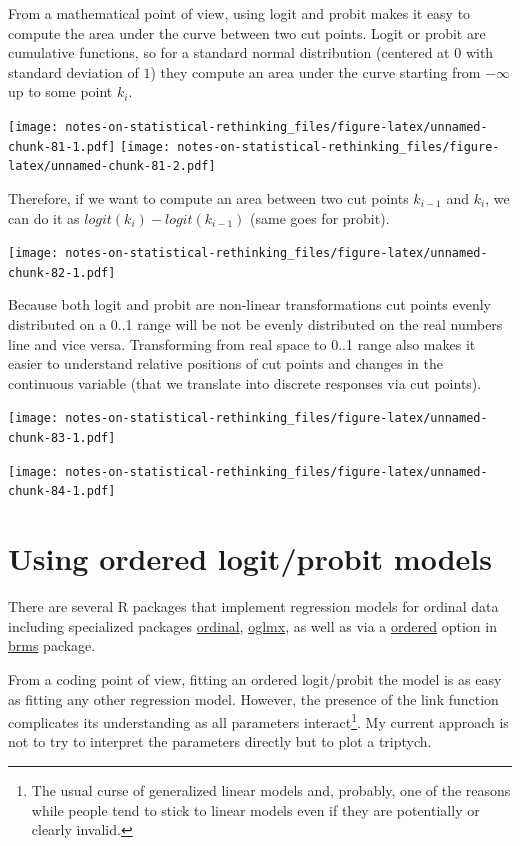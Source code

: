 \documentclass[
]{book}
\begin{document}
From a mathematical point of view, using logit and probit makes it easy to compute the area under the curve between two cut points. Logit or probit are cumulative functions, so for a standard normal distribution (centered at \(0\) with standard deviation of \(1\)) they compute an area under the curve starting from \(-\infty\) up to some point \(k_i\).

\texttt{[image: notes-on-statistical-rethinking\_files/figure-latex/unnamed-chunk-81-1.pdf]} \texttt{[image: notes-on-statistical-rethinking\_files/figure-latex/unnamed-chunk-81-2.pdf]}

Therefore, if we want to compute an area between two cut points \(k_{i-1}\) and \(k_i\), we can do it as \(logit(k_{i})-logit(k_{i-1})\) (same goes for probit).

\texttt{[image: notes-on-statistical-rethinking\_files/figure-latex/unnamed-chunk-82-1.pdf]}

Because both logit and probit are non-linear transformations cut points evenly distributed on a 0..1 range will be not be evenly distributed on the real numbers line and vice versa. Transforming from real space to 0..1 range also makes it easier to understand relative positions of cut points and changes in the continuous variable (that we translate into discrete responses via cut points).

\texttt{[image: notes-on-statistical-rethinking\_files/figure-latex/unnamed-chunk-83-1.pdf]}

\texttt{[image: notes-on-statistical-rethinking\_files/figure-latex/unnamed-chunk-84-1.pdf]}

\hypertarget{using-ordered-logitprobit-models}{%
\section{Using ordered logit/probit models}\label{using-ordered-logitprobit-models}}

There are several R packages that implement regression models for ordinal data including specialized packages \href{https://cran.r-project.org/package=ordinal}{ordinal}, \href{https://cran.r-project.org/package=oglmx}{oglmx}, as well as via a \href{https://cran.r-project.org/web/packages/brms/vignettes/brms_monotonic.html}{ordered} option in \href{https://cran.r-project.org/package=brms}{brms} package.

From a coding point of view, fitting an ordered logit/probit the model is as easy as fitting any other regression model. However, the presence of the link function complicates its understanding as all parameters interact\footnote{The usual curse of generalized linear models and, probably, one of the reasons while people tend to stick to linear models even if they are potentially or clearly invalid.}. My current approach is not to try to interpret the parameters directly but to plot a triptych.
\end{document}
